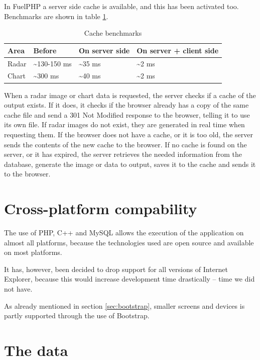 In FuelPHP a server side cache is available, and this has been activated too. Benchmarks are shown in table \ref{tab:cache_benchmarks}.

\begin{table}[htbp]
\centering
\begin{tabular}{|l|l|l|l|}
\hline
\textbf{Area} & \textbf{Before} & \textbf{On server side} & \textbf{On server + client side}\\
\hline
Radar & \textasciitilde 130-150 ms & \textasciitilde 35 ms & \textasciitilde 2 ms\\
\hline
Chart & \textasciitilde 300 ms & \textasciitilde 40 ms & \textasciitilde 2 ms\\
\hline
\end{tabular}
\caption{Cache benchmarks}
\label{tab:cache_benchmarks}
\end{table}

When a radar image or chart data is requested, the server checks if a cache of the output exists. If it does, it checks if the browser already has a copy of the same cache file and send a \textsf{301 Not Modified} response to the browser, telling it to use its own file. If radar images do not exist, they are generated in real time when requesting them.
If the browser does not have a cache, or it is too old, the server sends the contents of the new cache to the browser.
If no cache is found on the server, or it has expired, the server retrieves the needed information from the database, generate the image or data to output, saves it to the cache and sends it to the browser.

\section{Cross-platform compability}
\label{sec:cross-platform}
The use of PHP, C++ and MySQL allows the execution of the application on almost all platforms, because the technologies used are open source and available on most platforms.

It has, however, been decided to drop support for all versions of Internet Explorer, because this would increase development time drastically -- time we did not have.

As already mentioned in section \ref{sec:bootstrap}, smaller screens and devices is partly supported through the use of Bootstrap.

\section{The data}
\label{sec:the_data}
